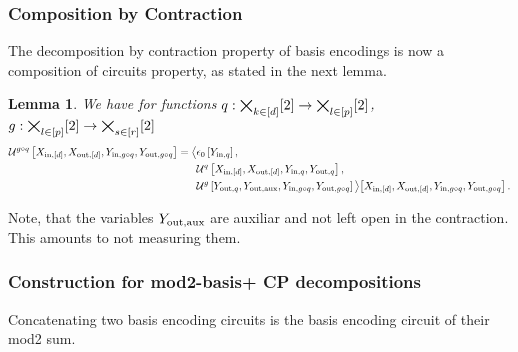 \documentclass[aps,onecolumn,nofootinbib,pra]{article}
\newtheorem{lemma}{Lemma}
\begin{document}
    \subsubsection{Composition by Contraction}

    The decomposition by contraction property of basis encodings is now a composition of circuits property, as stated in the next lemma.

    \begin{lemma}
        We have for functions $q:\bigtimes_{k\in[d]}[2]\rightarrow\bigtimes_{l\in[p]}[2]$, $g:\bigtimes_{l\in[p]}[2]\rightarrow\bigtimes_{s\in[r]}[2]$
        \begin{align*}
            \mathcal{U}^{g\circ q}\left[X_{\mathrm{in},[d]},X_{\mathrm{out},[d]},Y_{\mathrm{in},g\circ q},Y_{\mathrm{out},g\circ q}\right]
            = \big\langle 
            &\epsilon_{0}\left[Y_{\mathrm{in},q}\right],\\
            &\mathcal{U}^{q}\left[X_{\mathrm{in},[d]},X_{\mathrm{out},[d]},Y_{\mathrm{in},q},Y_{\mathrm{out},q}\right],\\
            &\mathcal{U}^{g}\left[Y_{\mathrm{out},q},Y_{\mathrm{out},\mathrm{aux}},Y_{\mathrm{in},g\circ q},Y_{\mathrm{out},g\circ q}\right]
             \big\rangle \big[ 
            X_{\mathrm{in},[d]},X_{\mathrm{out},[d]},Y_{\mathrm{in},g\circ q},Y_{\mathrm{out},g\circ q}
             \big] \, .
        \end{align*}
    \end{lemma}

    Note, that the variables $Y_{\mathrm{out},\mathrm{aux}}$ are auxiliar and not left open in the contraction.
    This amounts to not measuring them.

    \subsubsection{Construction for mod2-basis+ CP decompositions}

    Concatenating two basis encoding circuits is the basis encoding circuit of their mod2 sum.
\end{document}
